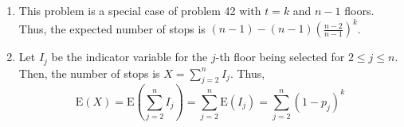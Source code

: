 \begin{enumerate}[label=(\alph*)]
\item This problem is a special case of problem 42 with $t=k$ and $n-1$ floors.
Thus, the expected number of stops is $(n-1) - (n-1)(\frac{n-2}{n-1})^{k}$.

\item Let $I_{j}$ be the indicator variable for the $j$-th floor being selected
for $2 \leq j \leq n$. Then, the number of stops is $X = \sum_{j=2}^{n}I_{j}$.
Thus, $$\text{E}(X) = \text{E}(\sum_{j=2}^{n}I_{j}) = \sum_{j=2}^{n}\text{E}(I_
{j}) = \sum_{j=2}^{n}(1 - p_{j})^{k}$$
\end{enumerate}
